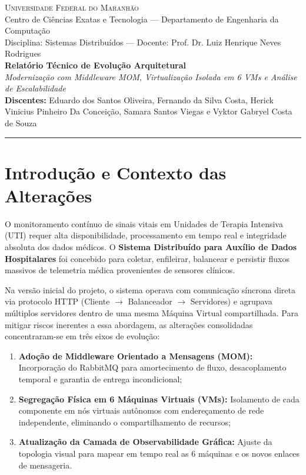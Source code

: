 \documentclass[11pt,a4paper]{article}
\begin{document}
\begin{center}
    {\large \textsc{Universidade Federal do Maranhão}}\\[1pt]
    {\small Centro de Ciências Exatas e Tecnologia — Departamento de Engenharia da Computação}\\[2pt]
    {\small Disciplina: Sistemas Distribuídos — Docente: Prof. Dr. Luiz Henrique Neves Rodrigues}\\[8pt]
    
    {\Large \textbf{Relatório Técnico de Evolução Arquitetural}}\\[2pt]
    {\large \textit{Modernização com Middleware MOM, Virtualização Isolada em 6 VMs e Análise de Escalabilidade}}\\[5pt]
    
    \textbf{Discentes:} Eduardo dos Santos Oliveira, Fernando da Silva Costa, Herick Vinicius Pinheiro Da Conceição, Samara Santos Viegas e Vyktor Gabryel Costa de Souza\\[6pt]
    \rule{\linewidth}{1pt}
\end{center}

\vspace{-0.3cm}

\section{Introdução e Contexto das Alterações}

O monitoramento contínuo de sinais vitais em Unidades de Terapia Intensiva (UTI) requer alta disponibilidade, processamento em tempo real e integridade absoluta dos dados médicos. O \textbf{Sistema Distribuído para Auxílio de Dados Hospitalares} foi concebido para coletar, enfileirar, balancear e persistir fluxos massivos de telemetria médica provenientes de sensores clínicos.

Na versão inicial do projeto, o sistema operava com comunicação síncrona direta via protocolo HTTP (Cliente $\to$ Balanceador $\to$ Servidores) e agrupava múltiplos servidores dentro de uma mesma Máquina Virtual compartilhada. Para mitigar riscos inerentes a essa abordagem, as alterações consolidadas concentraram-se em três eixos de evolução:
\begin{enumerate}
    \item \textbf{Adoção de Middleware Orientado a Mensagens (MOM):} Incorporação do RabbitMQ para amortecimento de fluxo, desacoplamento temporal e garantia de entrega incondicional;
    \item \textbf{Segregação Física em 6 Máquinas Virtuais (VMs):} Isolamento de cada componente em nós virtuais autônomos com endereçamento de rede independente, eliminando o compartilhamento de recursos;
    \item \textbf{Atualização da Camada de Observabilidade Gráfica:} Ajuste da topologia visual para mapear em tempo real as 6 máquinas e os novos enlaces de mensageria.
\end{enumerate}
\end{document}
